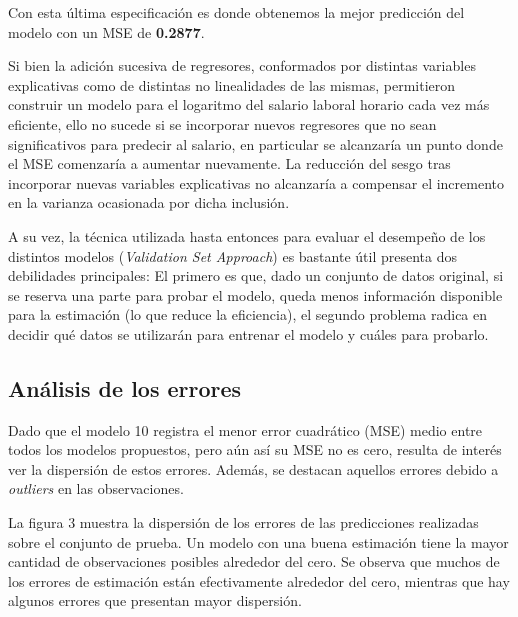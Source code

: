 \documentclass[11pt, a4paper]{article}
\begin{document}
Con esta última especificación es donde obtenemos la mejor predicción del modelo con un MSE de \textbf{0.2877}.

Si bien la adición sucesiva de regresores, conformados por distintas variables explicativas como de distintas no linealidades de las mismas, permitieron construir un modelo para el logaritmo del salario laboral horario cada vez más eficiente, ello no sucede si se incorporar nuevos regresores que no sean significativos para predecir al salario, en particular se alcanzaría un punto donde el MSE comenzaría a aumentar nuevamente. La reducción del sesgo tras incorporar nuevas variables explicativas no alcanzaría a compensar el incremento en la varianza ocasionada por dicha inclusión. 

A su vez, la técnica utilizada hasta entonces para evaluar el desempeño de los distintos modelos (\textit{Validation Set Approach}) es bastante útil presenta dos debilidades principales:  El primero es que, dado un conjunto de datos original, si se reserva una parte para probar el modelo, queda menos información disponible para la estimación (lo que reduce la eficiencia), el segundo problema radica en decidir qué datos se utilizarán para entrenar el modelo y cuáles para probarlo.

\subsection{Análisis de los errores}
Dado que el modelo 10 registra el menor error cuadrático (MSE) medio entre todos los modelos propuestos, pero aún así su MSE no es cero, resulta de interés ver la dispersión de estos errores. Además, se destacan aquellos errores debido a \textit{outliers} en las observaciones.

La figura 3 muestra la dispersión de los errores de las predicciones realizadas sobre el conjunto de prueba. Un modelo con una buena estimación tiene la mayor cantidad de observaciones posibles alrededor del cero. Se observa que muchos de los errores de estimación están efectivamente alrededor del cero, mientras que hay algunos errores que presentan mayor dispersión. 
\end{document}
